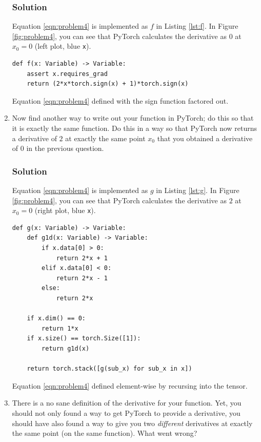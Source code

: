 \documentclass[letterpaper,11pt]{article}
\begin{document}
\begin{enumerate}
  \subsubsection*{Solution}
  Equation \ref{eqn:problem4} is implemented as $f$ in Listing
  \ref{lst:f}. In Figure \ref{fig:problem4}, you can see that PyTorch
  calculates the derivative as $0$ at $x_0 = 0$ (left plot, blue
  \texttt{x}).
  
  \begin{listing}
\begin{verbatim}
def f(x: Variable) -> Variable:
    assert x.requires_grad
    return (2*x*torch.sign(x) + 1)*torch.sign(x)
\end{verbatim}
  \caption{Equation \ref{eqn:problem4} defined with the sign function factored out.}
\label{lst:f}
\end{listing}

\item Now find another way to write out your function in PyTorch; do
  this so that it is exactly the same function. Do this in a way so
  that PyTorch now returns a derivative of $2$ at exactly the same
  point $x_0$ that you obtained a derivative of $0$ in the previous
  question.
  \subsubsection*{Solution}
  Equation \ref{eqn:problem4} is implemented as $g$ in Listing
  \ref{lst:g}. In Figure \ref{fig:problem4}, you can see that PyTorch
  calculates the derivative as $2$ at $x_0 = 0$ (right plot, blue
  \texttt{x}).
  
\begin{listing}
\begin{verbatim}
def g(x: Variable) -> Variable:
    def g1d(x: Variable) -> Variable:
        if x.data[0] > 0:
            return 2*x + 1
        elif x.data[0] < 0:
            return 2*x - 1
        else:
            return 2*x

    if x.dim() == 0:
        return 1*x    
    if x.size() == torch.Size([1]):
        return g1d(x)

    return torch.stack([g(sub_x) for sub_x in x])
\end{verbatim}
  \caption{Equation \ref{eqn:problem4} defined element-wise by recursing into the tensor.}
\label{lst:g}
\end{listing}
\item There is a no sane definition of the derivative for your
  function. Yet, you should not only found a way to get PyTorch to
  provide a derivative, you should have also found a way to give you
  two \emph{different} derivatives at exactly the same point (on the same
  function). What went wrong?


\end{enumerate}
\end{document}
